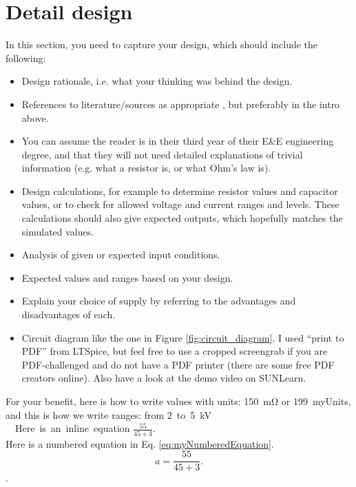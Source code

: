 \chapter{Detail design}\label{ch:detail_design}


In this section, you need to capture your design, which should include the following: 
\begin{itemize}
  \item Design rationale, i.e. what your thinking was behind the design.
  \item References to literature/sources as appropriate \cite{WebsiteOpAmp}, but preferably in the intro above.
  \item You can assume the reader is in their third year of their E\&E engineering degree, and that they will not need detailed explanations of trivial information (e.g. what a resistor is, or what Ohm's law is).  
  \item Design calculations, for example to determine resistor values and capacitor values, or to check for allowed voltage and current ranges and levels. These calculations should also give expected outputs, which hopefully matches the simulated values. 
  \item Analysis of given or expected input conditions. 
  \item Expected values and ranges based on your design. 
  \item Explain your choice of supply by referring to the advantages and disadvantages of each. 
  \item Circuit diagram like the one in Figure \ref{fig:circuit_diagram}. I used ``print to PDF'' from LTSpice,  but feel free to use a cropped screengrab if you are PDF-challenged and do not have a PDF printer (there are some free PDF creators online). Also have a look at the demo video on SUNLearn. 
\end{itemize}

\noindent For your benefit, here is how to write values with units: \SI{150}{\milli\ohm} or \SI{199}{myUnits}, and this is how we write ranges: from \SI{2} to \SI{5}{\kilo\volt}.\\

\noindent Here is an inline equation $ \frac{55}{45+3}$.\\Here is a numbered equation in Eq. \ref{eq:myNumberedEquation}.
\begin{equation}
   a = \frac{55}{45+3}
   \label{eq:myNumberedEquation}. 
\end{equation}. 

